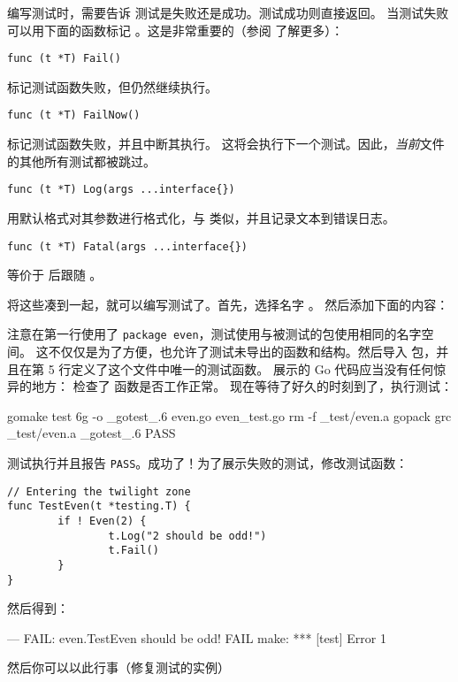 编写测试时，需要告诉  测试是失败还是成功。测试成功则直接返回。
当测试失败可以用下面的函数标记 \cite{go_doc}。这是非常重要的（参阅  了解更多）：

\begin{lstlisting}[numbers=none]
func (t *T) Fail()
\end{lstlisting}
 标记测试函数失败，但仍然继续执行。

\begin{lstlisting}[numbers=none]
func (t *T) FailNow()
\end{lstlisting}
 标记测试函数失败，并且中断其执行。
这将会执行下一个测试。因此，\emph{当前}文件的其他所有测试都被跳过。

\begin{lstlisting}[numbers=none]
func (t *T) Log(args ...interface{})
\end{lstlisting}
 用默认格式对其参数进行格式化，与
 类似，并且记录文本到错误日志。

\begin{lstlisting}[numbers=none]
func (t *T) Fatal(args ...interface{})
\end{lstlisting}
 等价于  后跟随 。

将这些凑到一起，就可以编写测试了。首先，选择名字 。
然后添加下面的内容：


注意在第一行使用了 \lstinline{package even}，测试使用与被测试的包使用相同的名字空间。
这不仅仅是为了方便，也允许了测试未导出的函数和结构。然后导入
 包，并且在第 5 行定义了这个文件中唯一的测试函数。
展示的 Go 代码应当没有任何惊异的地方：
检查了  函数是否工作正常。
现在等待了好久的时刻到了，执行测试：
\begin{display}
\pr gomake test
6g -o \_gotest\_.6 even.go  even\_test.go
rm -f \_test/even.a
gopack grc \_test/even.a \_gotest\_.6 
PASS
\end{display}
\noindent{}测试执行并且报告 \texttt{PASS}。成功了！为了展示失败的测试，修改测试函数：
\begin{lstlisting}
// Entering the twilight zone
func TestEven(t *testing.T) {
        if ! Even(2) {
                t.Log("2 should be odd!")
                t.Fail()
        }   
}
\end{lstlisting}
然后得到：
\begin{display}
--- FAIL: even.TestEven
\qquad{} should be odd!
FAIL
make: *** [test] Error 1
\end{display}
\noindent{}然后你可以以此行事（修复测试的实例）

